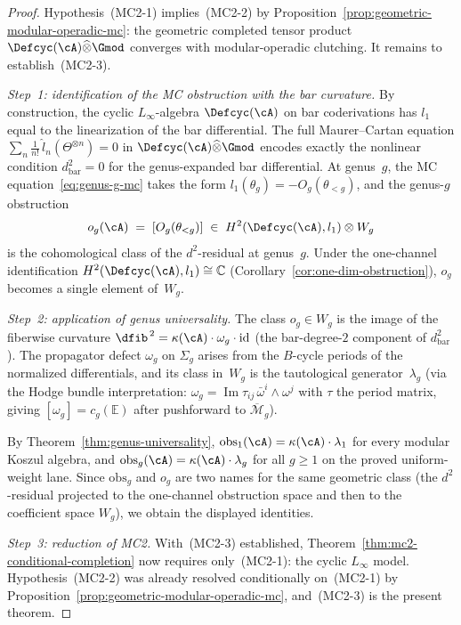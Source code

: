 \begin{proof}
Hypothesis~(MC2-1) implies~(MC2-2) by
Proposition~\ref{prop:geometric-modular-operadic-mc}: the geometric
completed tensor product
$\Defcyc(\cA) \widehat{\otimes} \Gmod$ converges with
modular-operadic clutching.  It remains to establish~(MC2-3).

\medskip\noindent
\emph{Step~1: identification of the MC obstruction with the bar
curvature.}
By construction, the cyclic $L_\infty$-algebra $\Defcyc(\cA)$ on bar
coderivations has $l_1$ equal to the linearization of the bar
differential.  The full Maurer--Cartan equation
$\sum_n \frac{1}{n!}\,\hat{l}_n(\Theta^{\otimes n}) = 0$ in
$\Defcyc(\cA)\widehat{\otimes}\Gmod$ encodes exactly the nonlinear
condition $d_{\mathrm{bar}}^2 = 0$ for the genus-expanded bar
differential.  At genus~$g$, the MC equation~\eqref{eq:genus-g-mc}
takes the form $l_1(\theta_g) = -O_g(\theta_{<g})$, and the
genus-$g$ obstruction
\[
  o_g(\cA)
  \;=\;
  [O_g(\theta_{<g})]
  \;\in\;
  H^2(\Defcyc(\cA), l_1) \otimes W_g
\]
is the cohomological class of the $d^2$-residual at genus~$g$.
Under the one-channel identification
$H^2(\Defcyc(\cA), l_1) \cong \mathbb{C}$
(Corollary~\ref{cor:one-dim-obstruction}), $o_g$ becomes a single
element of~$W_g$.

\medskip\noindent
\emph{Step~2: application of genus universality.}
The class $o_g \in W_g$ is the image of the fiberwise curvature
$\dfib^{\,2} = \kappa(\cA) \cdot \omega_g \cdot \mathrm{id}$
(the bar-degree-$2$ component of $d_{\mathrm{bar}}^2$).  The
propagator defect $\omega_g$ on $\Sigma_g$ arises from the
$B$-cycle periods of the normalized differentials, and its class
in~$W_g$ is the tautological generator~$\lambda_g$ (via the
Hodge bundle interpretation:
$\omega_g = \operatorname{Im}\tau_{ij}\,\bar{\omega}^i\wedge\omega^j$
with $\tau$ the period matrix, giving
$[\omega_g] = c_g(\mathbb{E})$ after pushforward to
$\overline{\mathcal{M}}_g$).

By Theorem~\ref{thm:genus-universality},
$\mathrm{obs}_1(\cA) = \kappa(\cA)\cdot\lambda_1$ for every
modular Koszul algebra, and
$\mathrm{obs}_g(\cA) = \kappa(\cA)\cdot\lambda_g$ for all
$g \ge 1$ on the proved uniform-weight lane.
Since $\mathrm{obs}_g$ and $o_g$ are two names for the same
geometric class (the $d^2$-residual projected to the one-channel
obstruction space and then to the coefficient space $W_g$), we
obtain the displayed identities.

\medskip\noindent
\emph{Step~3: reduction of MC2.}
With~(MC2-3) established, Theorem~\ref{thm:mc2-conditional-completion}
now requires only~(MC2-1): the cyclic $L_\infty$ model.
Hypothesis~(MC2-2) was already resolved conditionally on~(MC2-1) by
Proposition~\ref{prop:geometric-modular-operadic-mc}, and~(MC2-3) is
the present theorem.
\end{proof}

